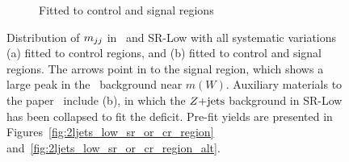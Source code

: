 \begin{figure}[tp]
\begin{subfigure}{0.48\textwidth}
\caption{Fitted to control and signal regions}
\label{fig:2ljets_low_crz_pre_post_post}
\end{subfigure}
\caption[
Distribution of $\mjj$ in CR-Z and SR-Low with all systematic variations
]{%
Distribution of $\mjj$ in \crz\ and SR-Low with all systematic variations
(a) fitted to control regions, and (b) fitted to control and signal regions.
The arrows point in to the signal region, which shows a large peak in the
\diboson\ background near $m(W)$.
Auxiliary materials to the paper~\cite{atlas2022searches} include (b), in which
the $Z\mathrm{+jets}$ background in SR-Low has been collapsed to fit the deficit.
Pre-fit yields are presented in Figures~\ref{fig:2ljets_low_sr_or_cr_region}
and~\ref{fig:2ljets_low_sr_or_cr_region_alt}.
}
\label{fig:2ljets_low_crz_pre_post}
\end{figure}


